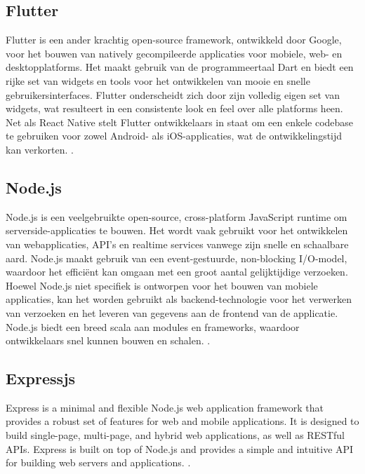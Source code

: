     \subsection{Flutter}
    
    Flutter is een ander krachtig open-source framework, ontwikkeld door Google, voor het bouwen van natively gecompileerde applicaties voor mobiele, web- en desktopplatforms. 
    Het maakt gebruik van de programmeertaal Dart en biedt een rijke set van widgets en tools voor het ontwikkelen van mooie en snelle gebruikersinterfaces. 
    Flutter onderscheidt zich door zijn volledig eigen set van widgets, wat resulteert in een consistente look en feel over alle platforms heen. 
    Net als React Native stelt Flutter ontwikkelaars in staat om een enkele codebase te gebruiken voor zowel Android- als iOS-applicaties, wat de ontwikkelingstijd kan verkorten. \autocite{flutter_docs}.

    \subsection{Node.js}
    
    Node.js is een veelgebruikte open-source, cross-platform JavaScript runtime om serverside-applicaties te bouwen. 
    Het wordt vaak gebruikt voor het ontwikkelen van webapplicaties, API's en realtime services vanwege zijn snelle en schaalbare aard. Node.js maakt gebruik van een event-gestuurde, 
    non-blocking I/O-model, waardoor het efficiënt kan omgaan met een groot aantal gelijktijdige verzoeken. Hoewel Node.js niet specifiek is ontworpen voor het bouwen van mobiele applicaties, 
    kan het worden gebruikt als backend-technologie voor het verwerken van verzoeken en het leveren van gegevens aan de frontend van de applicatie. Node.js biedt een breed scala aan modules en frameworks, 
    waardoor ontwikkelaars snel kunnen bouwen en schalen. \autocite{nodejs_docs}.

    \subsection{Expressjs}

    Express is a minimal and flexible Node.js web application framework that provides a robust set of features for web and mobile applications. 
    It is designed to build single-page, multi-page, and hybrid web applications, as well as RESTful APIs. Express is built on top of Node.js and provides a simple and intuitive API for building web servers and applications. \autocite{express_docs}.

